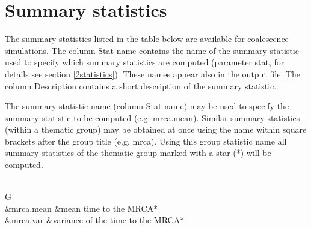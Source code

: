 \documentclass[letterpaper,12pt,oneside]{book}
\begin{document}
\begin{description}
\end{description}

\section{Summary statistics}\label{ssCoal}
The summary statistics listed in the table below are available for coalescence simulations. The column \textsf{Stat name} contains the name of the summary statistic used to specify which summary statistics are computed (parameter \textsf{stat}, for details see section \ref{2statistics}). These names appear also in the output file. The column \textsf{Description} contains a short description of the summary statistic. 

The summary statistic name (column \textsf{Stat name}) may be used to specify the summary statistic to be computed (e.g. \textsf{mrca.mean}). Similar summary statistics (within a thematic group) may be obtained at once using the name within square brackets after the group title (e.g. \textsf{mrca}). Using this group statistic name all summary statistics of the thematic group marked with a star (*) will be computed. 
\\
\\

\begin{supertabular}{G}
\\
 &mrca.mean			&mean time to the MRCA*\\
 &mrca.var			&variance of the time to the MRCA* \\
\end{supertabular}
\end{document}
